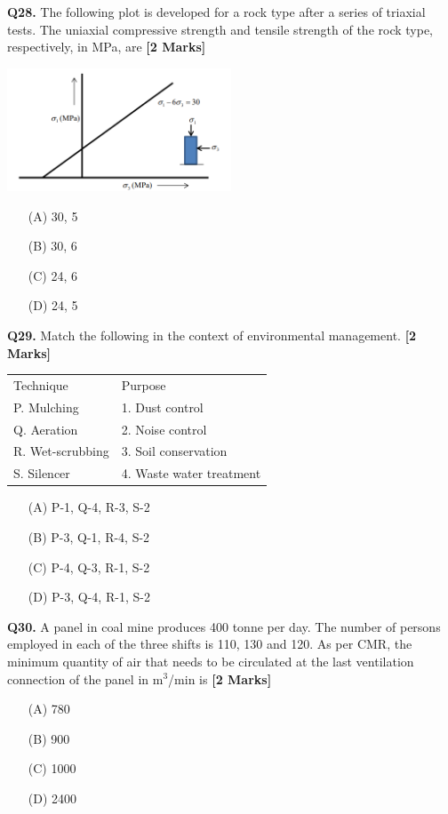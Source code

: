 \documentclass[11pt]{article}
\newcommand{\questionb}[2]{
    \noindent\textbf{Q#2.} #1 \hfill \textbf{[2 Marks]}
}
\begin{document}
\questionb{The following plot is developed for a rock type after a series of triaxial tests. The uniaxial compressive strength and tensile strength of the rock type, respectively, in MPa, are}{28}
\begin{center}
\includegraphics[width=0.5\textwidth]{figures/28.png}
\end{center}
\begin{enumerate}
    \item[(A)] 30, 5
    \item[(B)] 30, 6
    \item[(C)] 24, 6
    \item[(D)] 24, 5
\end{enumerate}
\vspace{0.5cm}

\questionb{Match the following in the context of environmental management.}{29}
\begin{tabular}{ll}
Technique & Purpose \\
P. Mulching & 1. Dust control \\
Q. Aeration & 2. Noise control \\
R. Wet-scrubbing & 3. Soil conservation \\
S. Silencer & 4. Waste water treatment \\
\end{tabular}

\begin{enumerate}
    \item[(A)] P-1, Q-4, R-3, S-2
    \item[(B)] P-3, Q-1, R-4, S-2
    \item[(C)] P-4, Q-3, R-1, S-2
    \item[(D)] P-3, Q-4, R-1, S-2
\end{enumerate}
\vspace{0.5cm}

\questionb{A panel in coal mine produces 400 tonne per day. The number of persons employed in each of the three shifts is 110, 130 and 120. As per CMR, the minimum quantity of air that needs to be circulated at the last ventilation connection of the panel in m\(^3\)/min is}{30}
\begin{enumerate}
    \item[(A)] 780
    \item[(B)] 900
    \item[(C)] 1000
    \item[(D)] 2400
\end{enumerate}
\vspace{0.5cm}
\end{document}
